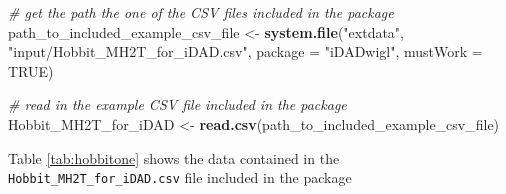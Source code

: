 \documentclass[]{elsarticle} %
\newenvironment{Shaded}{\begin{snugshade}}{\end{snugshade}}
\newcommand{\CommentTok}[1]{\textcolor[rgb]{0.56,0.35,0.01}{\textit{#1}}}
\newcommand{\DataTypeTok}[1]{\textcolor[rgb]{0.13,0.29,0.53}{#1}}
\newcommand{\KeywordTok}[1]{\textcolor[rgb]{0.13,0.29,0.53}{\textbf{#1}}}
\newcommand{\NormalTok}[1]{#1}
\newcommand{\OtherTok}[1]{\textcolor[rgb]{0.56,0.35,0.01}{#1}}
\newcommand{\StringTok}[1]{\textcolor[rgb]{0.31,0.60,0.02}{#1}}
\begin{document}
\begin{Shaded}
\begin{Highlighting}[]
\CommentTok{# get the path the one of the CSV files included in the package}
\NormalTok{path_to_included_example_csv_file <-}
\StringTok{  }\KeywordTok{system.file}\NormalTok{(}\StringTok{"extdata"}\NormalTok{,}
            \StringTok{"input/Hobbit_MH2T_for_iDAD.csv"}\NormalTok{,}
            \DataTypeTok{package =} \StringTok{"iDADwigl"}\NormalTok{,}
            \DataTypeTok{mustWork =} \OtherTok{TRUE}\NormalTok{)}

\CommentTok{# read in the example CSV file included in the package}
\NormalTok{Hobbit_MH2T_for_iDAD <-}
\StringTok{  }\KeywordTok{read.csv}\NormalTok{(path_to_included_example_csv_file)}
\end{Highlighting}
\end{Shaded}

\newpage

Table \ref{tab:hobbitone} shows the data contained in the \texttt{Hobbit\_MH2T\_for\_iDAD.csv} file included in the package
\end{document}
